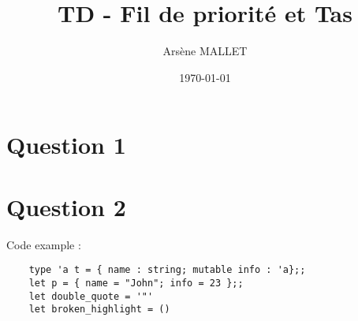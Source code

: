 \documentclass{article}
\title{TD - Fil de priorité et Tas}
\date{\today}
\author{Arsène MALLET}
\begin{document}
\thispagestyle{firstpage}

\begin{center}
    \huge{\@title}
\end{center}

\section*{Question 1}

\lipsum[1-2]

\section*{Question 2}

Code example : 
\begin{verbatim}
    type 'a t = { name : string; mutable info : 'a};;
    let p = { name = "John"; info = 23 };;
    let double_quote = '"'
    let broken_highlight = ()
\end{verbatim}
\end{document}
